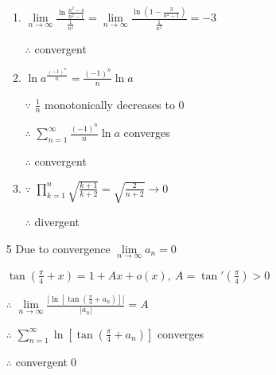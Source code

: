 \begin{enumerate}[1]
\begin{enumerate}[(1)]
                \item
                $\lim\limits_{n\rightarrow{\infty}}\frac{\ln \frac{n^2-4}{n^2-1}}{\frac{1}{n^2}}=\lim\limits_{n\rightarrow{\infty}}\frac{\ln \left(1-\frac{3}{n^2-1}\right)}{\frac{1}{n^2}}=-3$
                \par $\therefore$ convergent

                \item
                $\ln a^{\frac{(-1)^n}{n}}=\frac{(-1)^n}{n}\ln a$
                \par $\because$ $\frac{1}{n}$ monotonically decreases to 0
                \par $\therefore$ $\sum\limits_{n=1}^\infty \frac{(-1)^n}{n}\ln a$ converges
                \par $\therefore$ convergent

                \item
                $\because$ $\prod\limits_{k=1}^n \sqrt{\frac{k+1}{k+2}}=\sqrt{\frac{2}{n+2}}\rightarrow 0$
                \par $\therefore$ divergent
            \end{enumerate}

        \item[5]
        Due to convergence $\lim\limits_{n\rightarrow{\infty}}a_n=0$
        \par $\tan (\frac{\pi}{4}+x)=1+Ax+o(x),\  A=\tan '(\frac{\pi}{4})>0$
        \par $\therefore$ $\lim\limits_{n\rightarrow{\infty}}\frac{|\ln [\tan (\frac{\pi}{4}+a_n)]|}{|a_n|}=A$
        \par $\therefore$ $\sum\limits_{n=1}^\infty \ln [\tan (\frac{\pi}{4}+a_n)]$ converges
        \par $\therefore$ convergent\qed
    \end{enumerate}
